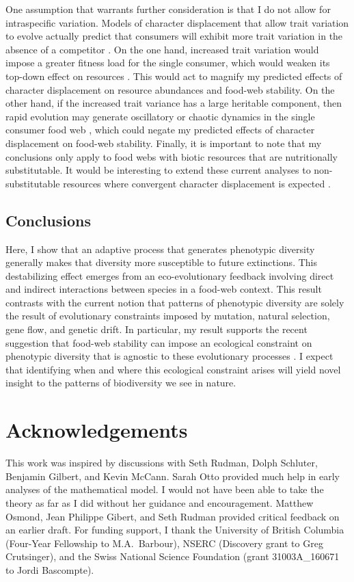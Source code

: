 \documentclass[11pt,]{article}
\begin{document}
One assumption that warrants further consideration is that I do not
allow for intraspecific variation. Models of character displacement that
allow trait variation to evolve actually predict that consumers will
exhibit more trait variation in the absence of a competitor
\citep{Taper1985}. On the one hand, increased trait variation would
impose a greater fitness load for the single consumer, which would
weaken its top-down effect on resources \citep{Schreiber2011}. This
would act to magnify my predicted effects of character displacement on
resource abundances and food-web stability. On the other hand, if the
increased trait variance has a large heritable component, then rapid
evolution may generate oscillatory or chaotic dynamics in the single
consumer food web \citep{Schreiber2011}, which could negate my predicted
effects of character displacement on food-web stability. Finally, it is
important to note that my conclusions only apply to food webs with
biotic resources that are nutritionally substitutable. It would be
interesting to extend these current analyses to non-substitutable
resources where convergent character displacement is expected
\citep{Abrams1987, Fox2008}.

\subsection{Conclusions}\label{conclusions}

Here, I show that an adaptive process that generates phenotypic
diversity generally makes that diversity more susceptible to future
extinctions. This destabilizing effect emerges from an eco-evolutionary
feedback involving direct and indirect interactions between species in a
food-web context. This result contrasts with the current notion that
patterns of phenotypic diversity are solely the result of evolutionary
constraints imposed by mutation, natural selection, gene flow, and
genetic drift. In particular, my result supports the recent suggestion
that food-web stability can impose an ecological constraint on
phenotypic diversity that is agnostic to these evolutionary processes
\citep{Borrelli2015b}. I expect that identifying when and where this
ecological constraint arises will yield novel insight to the patterns of
biodiversity we see in nature.

\section{Acknowledgements}\label{acknowledgements}

This work was inspired by discussions with Seth Rudman, Dolph Schluter,
Benjamin Gilbert, and Kevin McCann. Sarah Otto provided much help in
early analyses of the mathematical model. I would not have been able to
take the theory as far as I did without her guidance and encouragement.
Matthew Osmond, Jean Philippe Gibert, and Seth Rudman provided critical
feedback on an earlier draft. For funding support, I thank the
University of British Columbia (Four-Year Fellowship to M.A.~Barbour),
NSERC (Discovery grant to Greg Crutsinger), and the Swiss National
Science Foundation (grant 31003A\_160671 to Jordi Bascompte).


\end{document}
